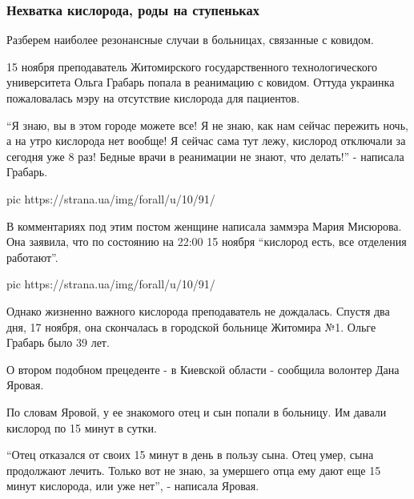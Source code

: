  
 
 
 
 

\subsubsection{Нехватка кислорода, роды на ступеньках}

Разберем наиболее резонансные случаи в больницах, связанные с ковидом. 

15 ноября преподаватель Житомирского государственного технологического
университета Ольга Грабарь попала в реанимацию с ковидом. Оттуда украинка
пожаловалась мэру на отсутствие кислорода для пациентов. 

\enquote{Я знаю, вы в этом городе можете все! Я не знаю, как нам сейчас пережить ночь,
а на утро кислорода нет вообще! Я сейчас сама тут лежу, кислород отключали за
сегодня уже 8 раз! Бедные врачи в реанимации не знают, что делать!} - написала
Грабарь.

\ifcmt
pic https://strana.ua/img/forall/u/10/91/%
\fi

В комментариях под этим постом женщине написала заммэра Мария Мисюрова. Она
заявила, что по состоянию на 22:00 15 ноября \enquote{кислород есть, все отделения
работают}. 

\ifcmt
pic https://strana.ua/img/forall/u/10/91/%
\fi

Однако жизненно важного кислорода преподаватель не дождалась. Спустя два дня,
17 ноября, она скончалась в городской больнице Житомира №1. Ольге Грабарь было
39 лет. 


О втором подобном прецеденте  - в Киевской области - сообщила волонтер Дана
Яровая.

По словам Яровой, у ее знакомого отец и сын попали в больницу. Им давали
кислород по 15 минут в сутки.

\enquote{Отец отказался от своих 15 минут в день в пользу сына. Отец умер, сына
продолжают лечить. Только вот не знаю, за умершего отца ему дают еще 15 минут
кислорода, или уже нет}, - написала Яровая.


